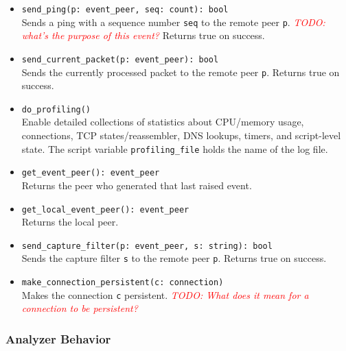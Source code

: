 \documentclass[10pt,landscape]{article}
\def\todo#1{\textit{\textcolor{red}{TODO: #1}}}
\newcommand{\ReturnsTrueOnSuccess}{Returns true on success.\xspace}
\begin{document}
\begin{multicols*}{2}
\begin{itemize}
    \ReturnsTrueOnSuccess
  \item \verb|send_ping(p: event_peer, seq: count): bool|\\
    Sends a ping with a sequence number \verb|seq| to the remote peer \verb|p|.
    \todo{what's the purpose of this event?}
    \ReturnsTrueOnSuccess
  \item \verb|send_current_packet(p: event_peer): bool|\\
    Sends the currently processed packet to the remote peer \verb|p|.
    \ReturnsTrueOnSuccess
  \item \verb|do_profiling()|\\
    Enable detailed collections of statistics about CPU/memory usage,
    connections, TCP states/reassembler, DNS lookups, timers, and script-level
    state. The script variable \verb|profiling_file| holds the name of the log
    file.
  \item \verb|get_event_peer(): event_peer|\\
    Returns the peer who generated that last raised event.
  \item \verb|get_local_event_peer(): event_peer|\\
    Returns the local peer.
  \item \verb|send_capture_filter(p: event_peer, s: string): bool|\\
    Sends the capture filter \verb|s| to the remote peer \verb|p|.
    \ReturnsTrueOnSuccess
  \item \verb|make_connection_persistent(c: connection)|\\
    Makes the connection \verb|c| persistent. \todo{What does it mean for a
    connection to be persistent?}
\end{itemize}

\subsubsection*{Analyzer Behavior}


\end{multicols*}
\end{document}
